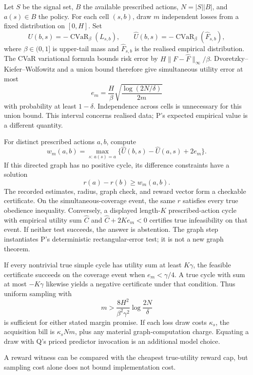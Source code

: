 \documentclass{article}
\begin{document}
Let \(S\) be the signal set, \(B\) the available prescribed actions, \(N=|S||B|\), and \(a(s)\in B\) the policy. For each cell \((s,b)\), draw \(m\) independent losses from a fixed distribution on \([0,H]\). Set
\[
U(b,s)=-\operatorname{CVaR}_{\beta}(L_{s,b}),
\qquad
\widehat U(b,s)
=-\operatorname{CVaR}_{\beta}(\widehat F_{s,b}),
\]
where \(\beta\in(0,1]\) is upper-tail mass and \(\widehat F_{s,b}\) is the realised empirical distribution. The CVaR variational formula bounds risk error by \(H\|F-\widehat F\|_{\infty}/\beta\). Dvoretzky--Kiefer--Wolfowitz and a union bound therefore give simultaneous utility error at most
\[
e_m=\frac{H}{\beta}
\sqrt{\frac{\log(2N/\delta)}{2m}}
\]
with probability at least \(1-\delta\). Independence across cells is unnecessary for this union bound. This interval concerns realised data; P's expected empirical value is a different quantity. 

For distinct prescribed actions \(a,b\), compute
\[
w_m(a,b)=
\max_{s:\,a(s)=a}
\{\widehat U(b,s)-\widehat U(a,s)+2e_m\}.
\]
If this directed graph has no positive cycle, its difference constraints have a solution
\[
r(a)-r(b)\geq w_m(a,b).
\]
The recorded estimates, radius, graph check, and reward vector form a checkable certificate. On the simultaneous-coverage event, the same \(r\) satisfies every true obedience inequality. Conversely, a displayed length-\(K\) prescribed-action cycle with empirical utility sum \(\widehat C\) and \(\widehat C+2Ke_m<0\) certifies true infeasibility on that event. If neither test succeeds, the answer is abstention. The graph step instantiates P's deterministic rectangular-error test; it is not a new graph theorem. 

If every nontrivial true simple cycle has utility sum at least \(K\gamma\), the feasible certificate succeeds on the coverage event when \(e_m<\gamma/4\). A true cycle with sum at most \(-K\gamma\) likewise yields a negative certificate under that condition. Thus uniform sampling with
\[
m>
\frac{8H^2}{\beta^2\gamma^2}
\log\frac{2N}{\delta}
\]
is sufficient for either stated margin promise. If each loss draw costs \(\kappa_s\), the acquisition bill is \(\kappa_sNm\), plus any material graph-computation charge. Equating a draw with Q's priced predictor invocation is an additional model choice. 

\begin{claim}
A reward witness can be compared with the cheapest true-utility reward cap, but sampling cost alone does not bound implementation cost.
\end{claim}
\end{document}
